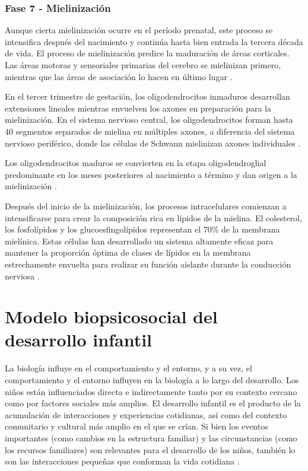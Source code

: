 \subsubsection{Fase 7 - Mielinización}
Aunque cierta mielinización ocurre en el período prenatal, este proceso se
intensifica después del nacimiento y continúa hasta bien entrada la tercera
década de vida. El proceso de mielinización predice la maduración de áreas
corticales. Las áreas motoras y sensoriales primarias del cerebro se mielinizan
primero, mientras que las áreas de asociación lo hacen en último lugar
\cite{Gibb2018}.

En el tercer trimestre de gestación, los oligodendrocitos inmaduros desarrollan
extensiones lineales mientras envuelven los axones en preparación para la
mielinización. En el sistema nervioso central, los oligodendrocitos forman
hasta 40 segmentos separados de mielina en múltiples axones, a diferencia del
sistema nervioso periférico, donde las células de Schwann mielinizan axones
individuales \cite{Polin124}.

Los oligodendrocitos maduros se convierten en la etapa oligodendroglial
predominante en los meses posteriores al nacimiento a término y dan origen a la
mielinización \cite{Polin124}.

Después del inicio de la mielinización, los procesos intracelulares comienzan a
intensificarse para crear la composición rica en lípidos de la mielina. El
colesterol, los fosfolípidos y los glucoesfingolípidos representan el 70\% de
la membrana mielínica. Estas células han desarrollado un sistema altamente
eficaz para mantener la proporción óptima de clases de lípidos en la membrana
estrechamente envuelta para realizar su función aislante durante la conducción
nerviosa \cite{Polin124}.

\section{Modelo biopsicosocial del desarrollo infantil}
La biología influye en el comportamiento y el entorno, y a su vez, el
comportamiento y el entorno influyen en la biología a lo largo del desarrollo.
Los niños están influenciados directa e indirectamente tanto por su contexto
cercano como por factores sociales más amplios. El desarrollo infantil es el
producto de la acumulación de interacciones y experiencias cotidianas, así como
del contexto comunitario y cultural más amplio en el que se crían. Si bien los
eventos importantes (como cambios en la estructura familiar) y las
circunstancias (como los recursos familiares) son relevantes para el desarrollo
de los niños, también lo son las interacciones pequeñas que conforman la vida
cotidiana \cite{Feldman3}.

